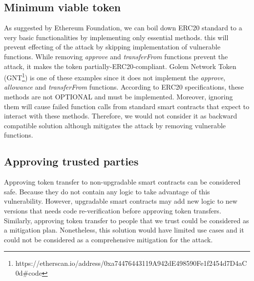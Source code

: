 \subsection{Minimum viable token}
As suggested by Ethereum Foundation\cite{Ref05}, we can boil down ERC20 standard to a very basic functionalities by implementing only essential methods. this will prevent effecting of the attack by skipping implementation of vulnerable functions. While removing \textit{approve} and \textit{transferFrom} functions prevent the attack, it makes the token partially-ERC20-compliant. Golem Network Token (GNT\footnote{https://etherscan.io/address/0xa74476443119A942dE498590Fe1f2454d7\newline D4aC0d\#code}) is one of these examples since it does not implement the \textit{approve}, \textit{allowance} and \textit{transferFrom} functions. According to ERC20 specifications\cite{Ref08}, these methods are not OPTIONAL and must be implemented. Moreover, ignoring them will cause failed function calls from standard smart contracts that expect to interact with these methods. Therefore, we would not consider it as backward compatible solution although mitigates the attack by removing vulnerable functions.

\subsection{Approving trusted parties}
Approving token transfer to non-upgradable smart contracts can be considered safe. Because they do not contain any logic to take advantage of this vulnerability. However, upgradable smart contracts may add new logic to new versions that needs code re-verification before approving token transfers. Similarly, approving token transfer to people that we trust could be considered as a mitigation plan. Nonetheless, this solution would have limited use cases and it could not be considered as a comprehensive mitigation for the attack.

